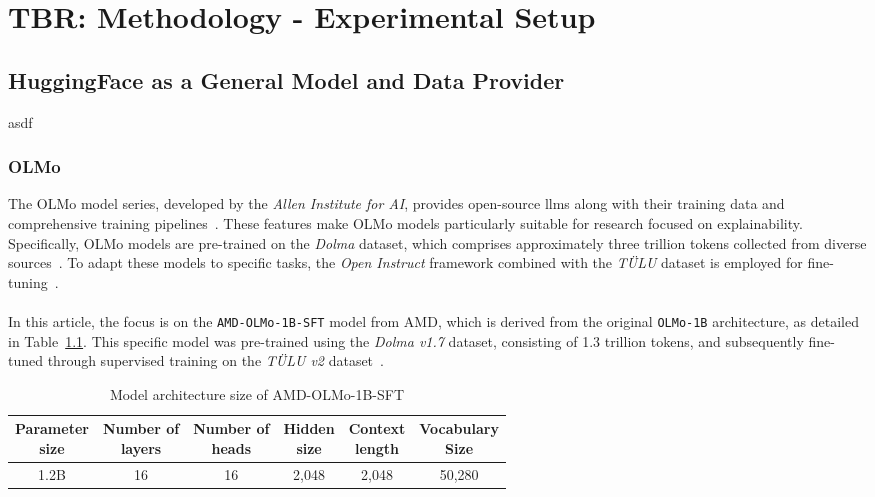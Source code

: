 \chapter{TBR: Methodology - Experimental Setup}

\section{HuggingFace as a General Model and Data Provider}
asdf

\subsection{OLMo}
The OLMo model series, developed by the \emph{Allen Institute for AI}, provides open-source \acrshort{llm}s along with their training data and comprehensive training pipelines~\cite{Groeneveld2023OLMo}. These features make OLMo models particularly suitable for research focused on explainability. Specifically, OLMo models are pre-trained on the \emph{Dolma} dataset, which comprises approximately three trillion tokens collected from diverse sources~\cite{dolma}. To adapt these models to specific tasks, the \emph{Open Instruct} framework combined with the \emph{TÜLU} dataset is employed for fine-tuning~\cite{ivison2023camels}.
\\\\
In this article, the focus is on the \texttt{AMD-OLMo-1B-SFT} model from AMD, which is derived from the original \texttt{OLMo-1B} architecture, as detailed in Table~\ref{tab:model_architecture_olmo_1b_amd}. This specific model was pre-trained using the \emph{Dolma v1.7} dataset, consisting of 1.3 trillion tokens, and subsequently fine-tuned through supervised training on the \emph{TÜLU v2} dataset~\cite{AMD-OLMo}.
\begin{table}[htb]
    \centering
    \begin{tabular}{|c|c|c|c|c|c|}
        \hline  
        \BreakHeader{Parameter \\ size} & \BreakHeader{Number of \\ layers} & \BreakHeader{Number of \\ heads} & \BreakHeader{Hidden \\ size} & \BreakHeader{Context \\ length} & \BreakHeader{Vocabulary \\ Size} \\ 
        \hline  
        1.2B & 16 & 16 & 2{,}048 & 2{,}048 & 50{,}280 \\
        \hline
    \end{tabular}
    \caption{Model architecture size of AMD-OLMo-1B-SFT \cite{AMD-OLMo}}
    \label{tab:model_architecture_olmo_1b_amd}
\end{table} 
